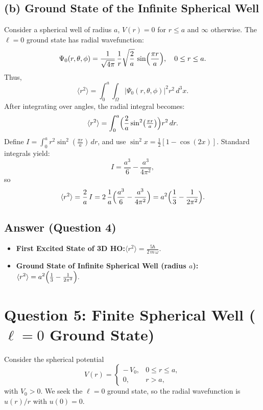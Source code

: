 \documentclass[12pt]{article}
\begin{document}
\subsection*{(b) Ground State of the Infinite Spherical Well}
Consider a spherical well of radius $a$, $V(r)=0$ for $r\le a$ and $\infty$ otherwise. The $\ell=0$ ground state has radial wavefunction:
\begin{equation}
\Psi_0(r,\theta,\phi) = \frac{1}{\sqrt{4\pi}}\,\frac{1}{r}\sqrt{\frac{2}{a}}\,\sin\Bigl(\frac{\pi r}{a}\Bigr), \quad 0\le r\le a.
\end{equation}
Thus,
\begin{equation}
\langle r^2 \rangle = \int_0^a \int_\Omega |\Psi_0(r,\theta,\phi)|^2 r^2 \,d^3x.
\end{equation}
After integrating over angles, the radial integral becomes:
\begin{equation}
\langle r^2 \rangle = \int_0^a \Bigl(\frac{2}{a}\sin^2\bigl(\tfrac{\pi r}{a}\bigr)\Bigr) r^2 \,dr.
\end{equation}
Define $I = \int_0^a r^2\sin^2(\tfrac{\pi r}{a})\,dr$, and use $\sin^2 x = \tfrac12[1 - \cos(2x)]$. Standard integrals yield:
\begin{equation}
I = \frac{a^3}{6} - \frac{a^3}{4\pi^2},
\end{equation}
so
\begin{equation}
\langle r^2 \rangle = \frac{2}{a}\,I = 2\,\frac{1}{a}\Bigl(\frac{a^3}{6} - \frac{a^3}{4\pi^2}\Bigr)
= a^2 \Bigl(\frac{1}{3} - \frac{1}{2\pi^2}\Bigr).
\end{equation}

\subsection*{Answer (Question 4)}
\begin{itemize}
\item \textbf{First Excited State of 3D HO:}\quad $\displaystyle \langle r^2 \rangle = \frac{5\hbar}{2\,m\,\omega}.$
\item \textbf{Ground State of Infinite Spherical Well (radius $a$):}\quad $\displaystyle \langle r^2 \rangle = a^2\Bigl(\tfrac{1}{3} - \tfrac{1}{2\pi^2}\Bigr).$
\end{itemize}







\section*{Question 5: Finite Spherical Well ($\ell=0$ Ground State)}
Consider the spherical potential
\begin{equation}
V(r) = \begin{cases}
-\,V_0, & 0 \le r \le a,\\
0, & r > a,
\end{cases}
\end{equation}
with $V_0 > 0$. We seek the $\ell=0$ ground state, so the radial wavefunction is $u(r)/r$ with $u(0)=0$.
\end{document}
